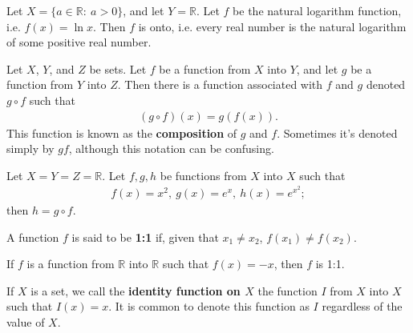 \documentclass[12pt]{article}
\begin{document}
\begin{exm}
  Let $X = \{a \in \mathbb{R}:\ a > 0\}$, and let $Y = \mathbb{R}$. Let $f$ be the
  natural logarithm function, i.e. $f(x) = \ln x$. Then $f$ is onto, i.e. every real
  number is the natural logarithm of some positive real number.
\end{exm}

\begin{defn}
  Let $X$, $Y$, and $Z$ be sets. Let $f$ be a function from $X$ into $Y$, and let $g$
  be a function from $Y$ into $Z$. Then there is a function associated with $f$ and
  $g$ denoted $g \circ f$ such that
  \begin{align*}
    (g \circ f)(x) = g(f(x)).
  \end{align*}
  This function is known as the \textbf{composition} of $g$ and $f$. Sometimes it's
  denoted simply by $gf$, although this notation can be confusing.
\end{defn}

\begin{exm}
  Let $X = Y = Z = \mathbb{R}$. Let $f,g,h$ be functions from $X$ into $X$ such that
  \begin{align*}
    f(x) = x^2,\ g(x) = e^x,\ h(x) = e^{x^2};
  \end{align*}
  then $h = g \circ f$.
\end{exm}

\begin{defn}
  A function $f$ is said to be \textbf{1:1} if, given that $x_1 \neq x_2$, $f(x_1)
  \neq f(x_2)$.
\end{defn}

\begin{exm}
  If $f$ is a function from $\mathbb{R}$ into $\mathbb{R}$ such that $f(x) = -x$,
  then $f$ is 1:1.
\end{exm}

\begin{defn}
  If $X$ is a set, we call the \textbf{identity function on $X$} the function $I$
  from $X$ into $X$ such that $I(x) = x$. It is common to denote this function as $I$
  regardless of the value of $X$.
\end{defn}
\end{document}
